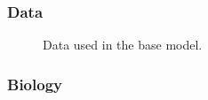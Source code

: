 \documentclass[
]{scrartcl}
\begin{document}
\newpage

\subsubsection{Data}\label{data-1}

\begin{figure}


\caption{\label{fig-data}Data used in the base model.}

\end{figure}%

\newpage

\subsubsection{Biology}\label{biology}
\end{document}
